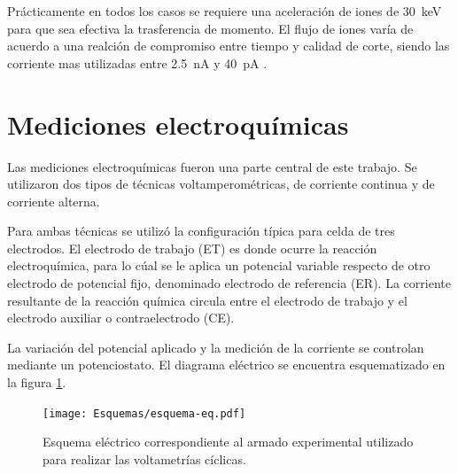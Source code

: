 		Prácticamente en todos los casos se requiere una aceleración de iones de \SI{30}{\kilo\electronvolt} para que sea efectiva la trasferencia de momento. El flujo de iones varía de acuerdo a una realción de compromiso entre tiempo y calidad de corte, siendo las corriente mas utilizadas entre \SI{2.5}{\nano\ampere} y \SI{40}{\pico\ampere} \cite{Orloff2003,Reyntjens2001}.

\section{Mediciones electroquímicas}\label{sec:medidas_eq}
			



			Las mediciones electroquímicas fueron una parte central de este trabajo. Se utilizaron dos tipos de técnicas voltamperométricas, de corriente continua y de corriente alterna. 	

			Para ambas técnicas se utilizó la configuración típica para celda de tres electrodos.\cite{Wi2000} El electrodo de trabajo (ET) es donde ocurre la reacción electroquímica, para lo cúal se le aplica un potencial variable respecto de otro electrodo de potencial fijo, denominado electrodo de referencia (ER). La corriente resultante de la reacción química circula entre el electrodo de trabajo y el electrodo auxiliar o contraelectrodo (CE). 
		
			La variación del potencial aplicado y la medición de la corriente se controlan mediante un potenciostato. El diagrama eléctrico se encuentra esquematizado en la figura \ref{fig:eq-circuito}.

				\begin{figure}[h!]
			 		  \begin{center}
			 		  \texttt{[image: Esquemas/esquema-eq.pdf]}
			 		  \caption[Circuito eléctrico EQ]{Esquema eléctrico correspondiente al armado experimental utilizado para realizar las voltametrías cíclicas.}
			 		  \label{fig:eq-circuito}
			 		  \end{center}
			 		  \end{figure}

